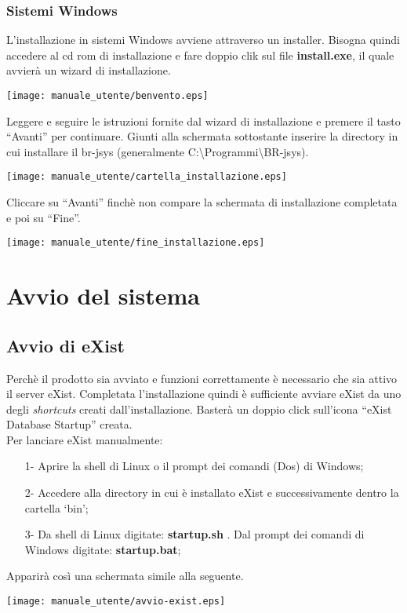\subsection{Sistemi Windows}
L'installazione in sistemi Windows avviene attraverso un installer. Bisogna quindi accedere al cd rom di installazione e fare doppio clik sul file  \textbf{install.exe}, il quale avvier\`a un wizard di installazione.
\begin{center}
\texttt{[image: manuale\_utente/benvento.eps]}\\
\end{center}
Leggere e seguire le istruzioni fornite dal wizard di installazione e premere il tasto ``Avanti'' per continuare.
Giunti alla schermata sottostante inserire la directory in cui installare il br-jsys (generalmente C:\textbackslash Programmi\textbackslash BR-jsys).
\begin{center}
\texttt{[image: manuale\_utente/cartella\_installazione.eps]}\\
\end{center}
Cliccare su ``Avanti'' finch\`e non compare la schermata di installazione completata e poi su ``Fine''.
\begin{center}
\texttt{[image: manuale\_utente/fine\_installazione.eps]}\\
\end{center}

\chapter{Avvio del sistema}
\section{Avvio di eXist}
Perch\`e il prodotto sia avviato e funzioni correttamente \`e necessario che sia attivo il server eXist. Completata l'installazione quindi è sufficiente avviare eXist da uno degli \textit{shortcuts} creati dall'installazione. Baster\`a un doppio click sull'icona ``eXist Database Startup'' creata.\\
Per lanciare eXist manualmente:
\begin{itemize}
\item[1-] Aprire la shell di Linux o il prompt dei comandi (Dos) di Windows;
\item[2-] Accedere alla directory in cui \`e installato eXist e successivamente dentro la cartella `bin';
\item[3-] Da shell di Linux digitate:  \textbf{startup.sh} . Dal prompt dei comandi di Windows digitate: \textbf{startup.bat};
\end{itemize}	
Apparir\`a cos\`i una schermata simile alla seguente.
\begin{center}
\texttt{[image: manuale\_utente/avvio-exist.eps]}\\
\end{center}

